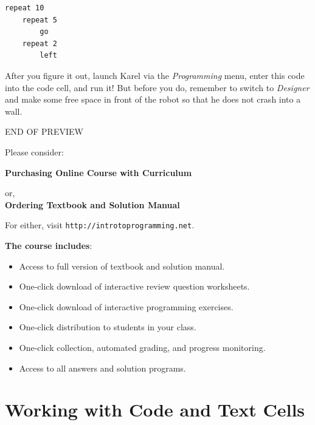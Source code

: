 \begin{verbatim}
repeat 10
    repeat 5
        go
    repeat 2
        left
\end{verbatim}
After you figure it out, launch Karel via the {\em Programming} menu, enter this code into
the code cell, and run it! But before you do, remember to switch to {\em Designer} and make 
some free space in front of the robot 
so that he does not crash into a wall.



\newpage
\iffullversion
\else
\vbox{}
\vfill
\pagestyle{empty}
    \begin{center}
    {\huge \color{red}END OF PREVIEW}\\[2cm]

\centerline{\Large Please consider:}
\vspace{1cm}

{\Large \bf Purchasing Online Course with Curriculum}
\vspace{1cm}

    {\Large or,}\\[1cm]

{\Large \bf Ordering Textbook and Solution Manual}
\vspace{1cm}

    {\Large For either, visit {\tt http://introtoprogramming.net}. \\[2cm]
}
\end{center}
{\bf The course includes}:
\begin{itemize}
\item Access to full version of textbook and solution manual.
\item One-click download of interactive review question worksheets.
\item One-click download of interactive programming exercises.
\item One-click distribution to students in your class.
\item One-click collection, automated grading, and progress monitoring.
\item Access to all answers and solution programs.
\end{itemize}

\vfill
    
\fi




\section{Working with Code and Text Cells} \label{sec:editmenu}

